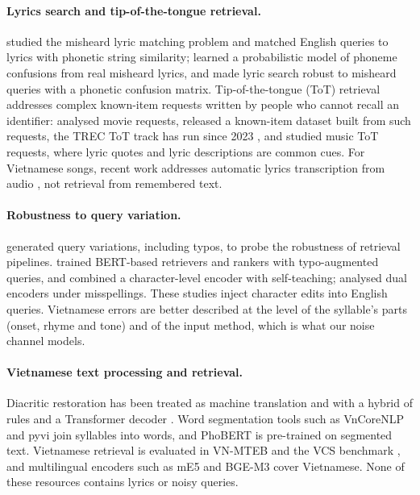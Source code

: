 \documentclass[11pt]{article}
\begin{document}
\paragraph{Lyrics search and tip-of-the-tongue retrieval.}
\citet{ring2009lucy} studied the misheard lyric matching problem and matched English queries to lyrics with
phonetic string similarity; \citet{hirjee2010misheard} learned a probabilistic model of phoneme confusions
from real misheard lyrics, and \citet{xu2009lyric} made lyric search robust to misheard queries with a
phonetic confusion matrix. Tip-of-the-tongue (ToT) retrieval addresses complex known-item requests written
by people who cannot recall an identifier: \citet{arguello2021tot} analysed movie requests, \citet{bhargav2022tot}
released a known-item dataset built from such requests, the TREC ToT track has run since 2023
\citep{arguello2023trectot}, and \citet{bhargav2023music} studied music ToT requests, where lyric quotes
and lyric descriptions are common cues. For Vietnamese songs, recent work addresses automatic lyrics
transcription from audio \citep{nguyen2025vietlyrics}, not retrieval from remembered text.

\paragraph{Robustness to query variation.}
\citet{penha2022variation} generated query variations, including typos, to probe the robustness of retrieval
pipelines. \citet{zhuang2021typos} trained BERT-based retrievers and rankers with typo-augmented queries, and
\citet{zhuang2022characterbert} combined a character-level encoder with self-teaching;
\citet{sidiropoulos2022misspellings} analysed dual encoders under misspellings. These studies inject
character edits into English queries. Vietnamese errors are better described at the level of the syllable's
parts (onset, rhyme and tone) and of the input method, which is what our noise channel models.

\paragraph{Vietnamese text processing and retrieval.}
Diacritic restoration has been treated as machine translation \citep{pham2017diacritic} and with a hybrid
of rules and a Transformer decoder \citep{dang2020tdp}. Word segmentation tools such as VnCoreNLP
\citep{vu2018vncorenlp} and pyvi \citep{pyvi} join syllables into words, and PhoBERT \citep{nguyen2020phobert}
is pre-trained on segmented text. Vietnamese retrieval is evaluated in VN-MTEB \citep{pham2025vnmteb} and the
VCS benchmark \citep{nguyen2024vcs}, and multilingual encoders such as mE5 \citep{wang2024me5} and BGE-M3
\citep{chen2024bgem3} cover Vietnamese. None of these resources contains lyrics or noisy queries.
\end{document}
